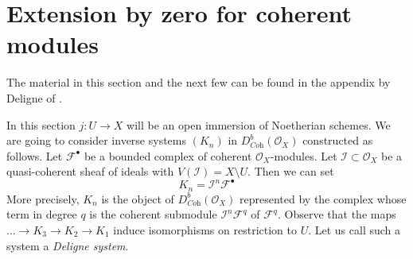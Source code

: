 \section{Extension by zero for coherent modules}
\label{section-extension-by-zero}

\noindent
The material in this section and the next few can be found
in the appendix by Deligne of \cite{RD}.

\medskip\noindent
In this section $j : U \to X$ will be an open immersion of Noetherian schemes.
We are going to consider inverse systems $(K_n)$ in
$D^b_{\textit{Coh}}(\mathcal{O}_X)$ constructed as follows.
Let $\mathcal{F}^\bullet$ be a bounded complex of coherent
$\mathcal{O}_X$-modules. Let $\mathcal{I} \subset \mathcal{O}_X$
be a quasi-coherent sheaf of ideals with $V(\mathcal{I}) = X \setminus U$.
Then we can set
$$
K_n = \mathcal{I}^n\mathcal{F}^\bullet
$$
More precisely, $K_n$ is the object of $D^b_{\textit{Coh}}(\mathcal{O}_X)$
represented by the complex whose term in degree $q$
is the coherent submodule $\mathcal{I}^n\mathcal{F}^q$ of $\mathcal{F}^q$.
Observe that the maps $\ldots \to K_3 \to K_2 \to K_1$ induce isomorphisms
on restriction to $U$. Let us call such a system a {\it Deligne system}.

